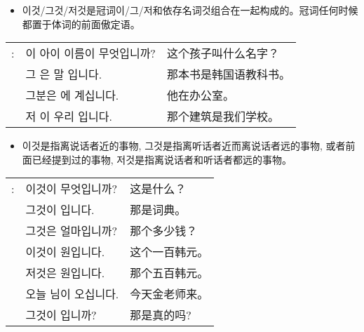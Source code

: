 \begin{grammar}
    \begin{grammarsect}[\kr 이것/그것/저것]
    \begin{itemize}
        \item {\kr 이것/그것/저것}是冠词{\kr 이/그/저}和依存名词{\kr 것}组合在一起构成的。冠词任何时候都置于体词的前面傲定语。
    \end{itemize}
    \begin{tabular}{lll}
        \kr \ruby{例}{예}: &\kr 이 아이 이름이 무엇입니까?&这个孩子叫什么名字？\\
        &\kr 그 \ruby{冊}{책}은 \ruby{韓國}{한국}말 \ruby{敎科書}{교과서}입니다.&那本书是韩国语教科书。\\
        &\kr 그분은 \ruby{事務室}{사무실}에 계십니다.&他在办公室。\\
        &\kr 저 \ruby{建物}{건물}이 우리 \ruby{學校}{학교}입니다.&那个建筑是我们学校。\\
    \end{tabular}
    \begin{itemize}
        \item {\kr 이것}是指离说话者近的事物, {\kr 그것}是指离听话者近而离说话者远的事物, 或者前面已经提到过的事物, 저것是指离说话者和听话者都远的事物。
    \end{itemize}
    \begin{tabular}{lll}
        \kr \ruby{例}{예}: &\kr 이것이 무엇입니까?&这是什么？\\
        &\kr 그것이 \ruby{辭典}{사전}입니다.&那是词典。\\
        &\kr 그것은 얼마입니까?&那个多少钱？\\
        &\kr 이것이 \ruby{百}{백} 원입니다.&这个一百韩元。\\
        &\kr 저것은 \ruby{五百}{오백} 원입니다.&那个五百韩元。\\
        &\kr 오늘 \ruby{金}{김} \ruby{先生}{선생}님이 오십니다.&今天金老师来。\\
        &\kr 그것이 \ruby{事實}{사실}입니까?&那是真的吗?
    \end{tabular}\\
    \end{grammarsect}
\end{grammar}
